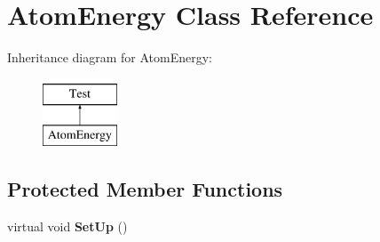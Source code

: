 \hypertarget{classAtomEnergy}{\section{Atom\-Energy Class Reference}
\label{classAtomEnergy}
}
Inheritance diagram for Atom\-Energy\-:\begin{figure}[H]
\begin{center}
\leavevmode
\includegraphics[height=2.000000cm]{classAtomEnergy}
\end{center}
\end{figure}
\subsection*{Protected Member Functions}
\begin{DoxyCompactItemize}
\item 
\hypertarget{classAtomEnergy_a6aadb2fedfe4de8b3ca04cb3a8527b41}{virtual void {\bfseries Set\-Up} ()}\label{classAtomEnergy_a6aadb2fedfe4de8b3ca04cb3a8527b41}

\end{DoxyCompactItemize}
